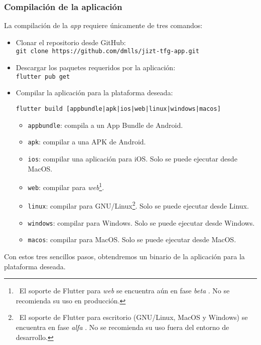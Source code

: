 \subsubsection{Compilación de la aplicación}

La compilación de la \emph{app} requiere únicamente de tres comandos:

\vspace{-0.2cm}
\begin{itemize} [\textbullet]
	\item Clonar el repositorio desde GitHub: \\
	\texttt{git clone https://github.com/dmlls/jizt-tfg-app.git}
	
	\item Descargar los paquetes requeridos por la aplicación: \\
	\texttt{flutter pub get}
	
	\item Compilar la aplicación para la plataforma deseada:
	
	\texttt{flutter build [appbundle|apk|ios|web|linux|windows|macos]}
	
	\begin{itemize} [◦]
		\item \texttt{appbundle}: compila a un App Bundle de Android.
		\item \texttt{apk}: compilar a una APK de Android.
		\item \texttt{ios}: compilar una aplicación para iOS. Solo se puede ejecutar desde MacOS.
		\item \texttt{web}: compilar para \emph{web}\footnote{\, El soporte de Flutter para \emph{web} se encuentra aún en fase \emph{beta} \cite{flutter-web}. No se recomienda su uso en producción.}.
		\item \texttt{linux}: compilar para GNU/Linux\footnote{\, El soporte de Flutter para escritorio (GNU/Linux, MacOS y Windows) se encuentra en fase \emph{alfa} \cite{flutter-desktop}. No se recomienda su uso fuera del entorno de desarrollo.}. Solo se puede ejecutar desde Linux.
		\item \texttt{windows}: compilar para Windows. Solo se puede ejecutar desde Windows.
		\item \texttt{macos}: compilar para MacOS. Solo se puede ejecutar desde MacOS.
	\end{itemize}
\end{itemize}

Con estos tres sencillos pasos, obtendremos un binario de la aplicación para la plataforma deseada.




